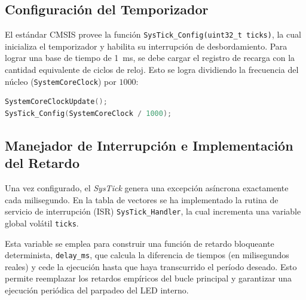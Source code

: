 \subsection{Configuración del Temporizador}

El estándar CMSIS provee la función \lstinline{SysTick_Config(uint32_t ticks)}, la cual inicializa el
temporizador y habilita su interrupción de desbordamiento. Para lograr una base de tiempo de \qty{1}{\ms},
se debe cargar el registro de recarga con la cantidad equivalente de ciclos de reloj. Esto se logra
dividiendo la frecuencia del núcleo (\lstinline{SystemCoreClock}) por $1000$:

\begin{lstlisting}[language=C]
SystemCoreClockUpdate();
SysTick_Config(SystemCoreClock / 1000);
\end{lstlisting}

\subsection{Manejador de Interrupción e Implementación del Retardo}

Una vez configurado, el \textit{SysTick} genera una excepción asíncrona exactamente cada milisegundo. En
la tabla de vectores se ha implementado la rutina de servicio de interrupción (ISR) \lstinline{SysTick_Handler},
la cual incrementa una variable global volátil \lstinline{ticks}.

Esta variable se emplea para construir una función de retardo bloqueante determinista, \lstinline{delay_ms},
que calcula la diferencia de tiempos (en milisegundos reales) y cede la ejecución hasta que haya
transcurrido el período deseado. Esto permite reemplazar los retardos empíricos del bucle principal y garantizar
una ejecución periódica del parpadeo del LED interno.
